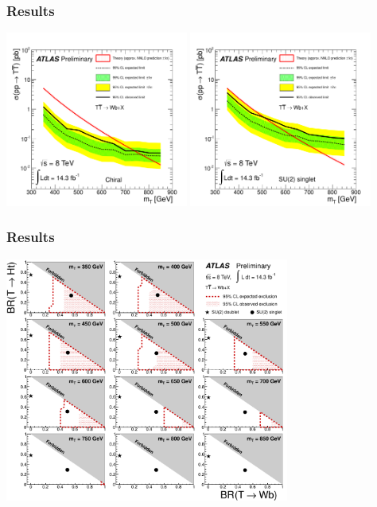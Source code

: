 \begin{frame}\frametitle{Results}
\centering\footnotesize

\includegraphics[width=0.45\textwidth]{pics/lim_chiral_bin1_WbX}
\includegraphics[width=0.45\textwidth]{pics/lim_singlet_bin1_WbX}


\end{frame}

\begin{frame}\frametitle{Results}
\centering\footnotesize

\includegraphics[width=0.7\textwidth]{pics/lim_Scan2D_tight_Bin1.pdf}

\end{frame}



